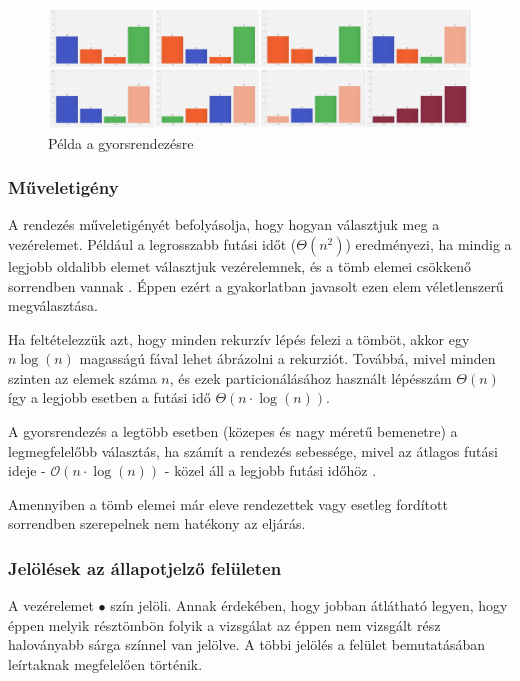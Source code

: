 \documentclass{elteikthesis}
\newcommand{\hiddensubsubsection}[1]{
	\stepcounter{subsubsection}
	\subsubsection*{{#1}}	
}
\begin{document}
 \begin{figure}[H]
 	\centering
 	\includegraphics[width=1\textwidth]{pics/quick.jpg}
 	\caption{Példa a gyorsrendezésre}
 \end{figure}
\hiddensubsubsection{Műveletigény}
A rendezés műveletigényét befolyásolja, hogy hogyan választjuk meg a vezérelemet. Például a legrosszabb futási időt ($\Theta(n^2)$) eredményezi, ha mindig a legjobb oldalibb elemet választjuk vezérelemnek, és a tömb elemei csökkenő sorrendben vannak \cite{Cormen}. Éppen ezért a gyakorlatban javasolt ezen elem véletlenszerű megválasztása.\par
Ha feltételezzük azt, hogy minden rekurzív lépés felezi a tömböt, akkor egy $n\log(n)$ magasságú fával lehet ábrázolni a rekurziót. Továbbá, mivel minden szinten az elemek száma $n$, és ezek particionálásához használt lépésszám $\Theta(n)$ így a legjobb esetben a futási idő $\Theta(n\cdot\log(n))$.\par
 A gyorsrendezés a legtöbb esetben (közepes és nagy méretű bemenetre) a legmegfelelőbb választás, ha számít a rendezés sebessége, mivel az átlagos futási ideje - $\mathcal{O}(n\cdot\log(n))$ - közel áll a legjobb futási időhöz \cite{Cormen}.\par
 Amennyiben a tömb elemei már eleve rendezettek vagy esetleg fordított sorrendben szerepelnek nem hatékony az eljárás.
\hiddensubsubsection{Jelölések az állapotjelző felületen}
A vezérelemet \textcolor{select}{\Huge$\bullet$} szín jelöli. Annak érdekében, hogy jobban átlátható legyen, hogy éppen melyik résztömbön folyik a vizsgálat az éppen nem vizsgált rész haloványabb sárga színnel van jelölve. A többi jelölés a felület bemutatásában leírtaknak megfelelően történik.
\end{document}
